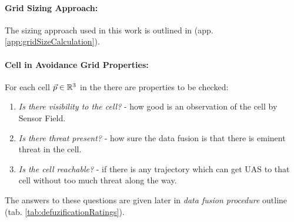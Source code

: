 \paragraph{Grid Sizing Approach:} The sizing approach used in this work is outlined in (app. \ref{app:gridSizeCalculation}).


\paragraph{Cell in Avoidance Grid Properties:}\noindent For each cell $\vec{p}\in\mathbb{R}^3$ in the there are properties to be checked:

\begin{enumerate}
    \item \emph{Is there visibility to the cell?} - how good is an observation of the cell by Sensor Field.
    
    \item \emph{Is there threat present?} - how sure the data fusion is that there is eminent threat in the cell.
    
    \item \emph{Is the cell reachable?} - if there is any trajectory which can get UAS to that cell without too much threat along the way.
\end{enumerate}

\noindent The answers to these questions are given later in \emph{data fusion procedure} outline (tab. \ref{tab:defuzificationRatings}).
